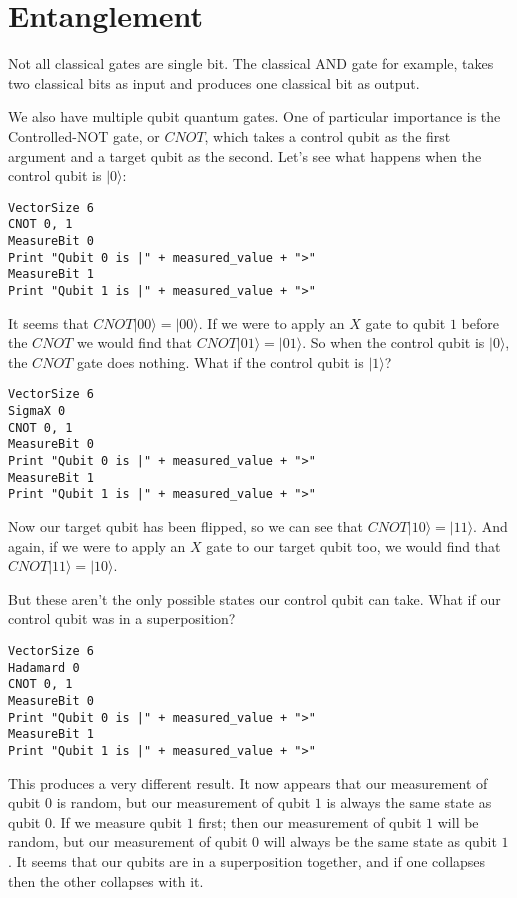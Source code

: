 \documentclass[twocolumn]{article}
\begin{document}
\section{Entanglement}

Not all classical gates are single bit. The classical AND gate for example, takes two classical bits as input and produces one classical bit as output.

We also have multiple qubit quantum gates. One of particular importance is the Controlled-NOT gate, or $CNOT$, which takes a control qubit as the first argument and a target qubit as the second. Let's see what happens when the control qubit is $|0\rangle$:

\begin{lstlisting}
VectorSize 6
CNOT 0, 1
MeasureBit 0
Print "Qubit 0 is |" + measured_value + ">"
MeasureBit 1
Print "Qubit 1 is |" + measured_value + ">"
\end{lstlisting}

It seems that $CNOT|00\rangle = |00\rangle$. If we were to apply an $X$ gate to qubit $1$ before the $CNOT$ we would find that $CNOT|01\rangle = |01\rangle$. So when the control qubit is $|0\rangle$, the $CNOT$ gate does nothing. What if the control qubit is $|1\rangle$?

\begin{lstlisting}
VectorSize 6
SigmaX 0
CNOT 0, 1
MeasureBit 0
Print "Qubit 0 is |" + measured_value + ">"
MeasureBit 1
Print "Qubit 1 is |" + measured_value + ">"
\end{lstlisting}

Now our target qubit has been flipped, so we can see that $CNOT|10\rangle = |11\rangle$. And again, if we were to apply an $X$ gate to our target qubit too, we would find that $CNOT|11\rangle = |10\rangle$.

But these aren't the only possible states our control qubit can take. What if our control qubit was in a superposition?

\begin{lstlisting}
VectorSize 6
Hadamard 0
CNOT 0, 1
MeasureBit 0
Print "Qubit 0 is |" + measured_value + ">"
MeasureBit 1
Print "Qubit 1 is |" + measured_value + ">"
\end{lstlisting}

This produces a very different result. It now appears that our measurement of qubit $0$ is random, but our measurement of qubit $1$ is always the same state as qubit $0$. If we measure qubit $1$ first; then our measurement of qubit $1$ will be random, but our measurement of qubit $0$ will always be the same state as qubit $1$. It seems that our qubits are in a superposition together, and if one collapses then the other collapses with it.
\end{document}
